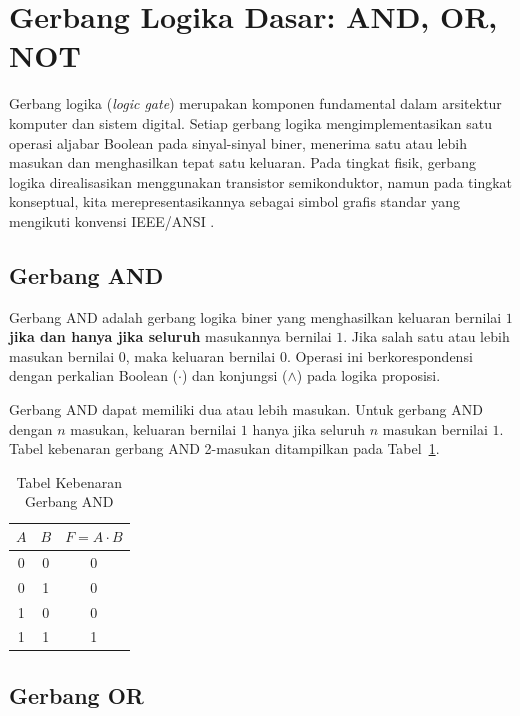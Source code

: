 \section{Gerbang Logika Dasar: AND, OR, NOT}

Gerbang logika (\textit{logic gate}) merupakan komponen fundamental dalam arsitektur komputer dan sistem digital. Setiap gerbang logika mengimplementasikan satu operasi aljabar Boolean pada sinyal-sinyal biner, menerima satu atau lebih masukan dan menghasilkan tepat satu keluaran. Pada tingkat fisik, gerbang logika direalisasikan menggunakan transistor semikonduktor, namun pada tingkat konseptual, kita merepresentasikannya sebagai simbol grafis standar yang mengikuti konvensi IEEE/ANSI \cite{allaboutcircuits_gates}.

\subsection{Gerbang AND}

\begin{definisi}
Gerbang AND adalah gerbang logika biner yang menghasilkan keluaran bernilai $1$ \textbf{jika dan hanya jika seluruh} masukannya bernilai $1$. Jika salah satu atau lebih masukan bernilai $0$, maka keluaran bernilai $0$. Operasi ini berkorespondensi dengan perkalian Boolean ($\cdot$) dan konjungsi ($\wedge$) pada logika proposisi.
\end{definisi}

Gerbang AND dapat memiliki dua atau lebih masukan. Untuk gerbang AND dengan $n$ masukan, keluaran bernilai $1$ hanya jika seluruh $n$ masukan bernilai $1$. Tabel kebenaran gerbang AND 2-masukan ditampilkan pada Tabel~\ref{tab:and-gate}.

\begin{table}[H]
\centering
\renewcommand{\arraystretch}{1.3}
\begin{tabular}{|c|c||c|}
\hline
$A$ & $B$ & $F = A \cdot B$ \\ \hline
0 & 0 & 0 \\ \hline
0 & 1 & 0 \\ \hline
1 & 0 & 0 \\ \hline
1 & 1 & 1 \\ \hline
\end{tabular}
\caption{Tabel Kebenaran Gerbang AND}
\label{tab:and-gate}
\end{table}

\subsection{Gerbang OR}

